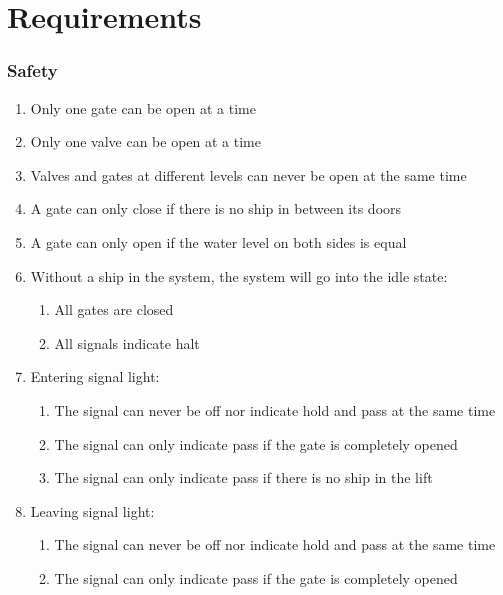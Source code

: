\section{Requirements}
\subsubsection*{Safety}
\begin{enumerate}
	\item Only one gate can be open at a time
	\item Only one valve can be open at a time
	\item Valves and gates at different levels can never be open at the same time
	\item A gate can only close if there is no ship in between its doors
	\item A gate can only open if the water level on both sides is equal
	\item Without a ship in the system, the system will go into the idle state:
	\begin{enumerate}
		\item All gates are closed
		\item All signals indicate halt
	\end{enumerate}
	\item Entering signal light:
	\begin{enumerate}
		\item The signal can never be off nor indicate hold and pass at the same time
		\item The signal can only indicate pass if the gate is completely opened
		\item The signal can only indicate pass if there is no ship in the lift
	\end{enumerate}
	\item Leaving signal light:
	\begin{enumerate}
		\item The signal can never be off nor indicate hold and pass at the same time
		\item The signal can only indicate pass if the gate is completely opened
	\end{enumerate}
\end{enumerate}
	

